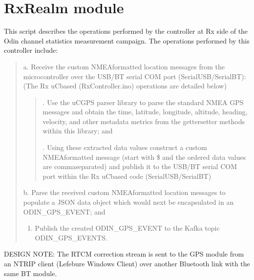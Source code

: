 \documentclass[letterpaper,10pt,english]{sphinxmanual}
\begin{document}
\section{RxRealm module}
\label{\detokenize{RxRealm:module-RxRealm}}\label{\detokenize{RxRealm:rxrealm-module}}\label{\detokenize{RxRealm::doc}}
\sphinxAtStartPar
This script describes the operations performed by the controller at Rx side of the Odin channel statistics
measurement campaign. The operations performed by this controller include:
\begin{quote}

\sphinxAtStartPar
a. Receive the custom NMEA\sphinxhyphen{}formatted location messages from the microcontroller over the USB/BT serial COM port
(SerialUSB/SerialBT): (The Rx uC\sphinxhyphen{}based (RxController.ino) operations are detailed below)
\begin{quote}

. Use the uC\sphinxhyphen{}GPS parser library to parse the standard NMEA GPS messages and obtain the time, latitude,
longitude, altitude, heading, velocity, and other metadata metrics from the getter\sphinxhyphen{}setter methods within
this library; and

. Using these extracted data values construct a custom NMEA\sphinxhyphen{}formatted message (start with \$ and the ordered
data values are comma\sphinxhyphen{}separated) and publish it to the USB/BT serial COM port within the Rx uC\sphinxhyphen{}based code
(SerialUSB/SerialBT)
\end{quote}

\sphinxAtStartPar
b. Parse the received custom NMEA\sphinxhyphen{}formatted location messages to populate a JSON data object which would next be
encapsulated in an ODIN\_GPS\_EVENT; and
\begin{enumerate}
%
\setcounter{enumi}{2}
\item {} 
\sphinxAtStartPar
Publish the created ODIN\_GPS\_EVENT to the Kafka topic ODIN\_GPS\_EVENTS.

\end{enumerate}
\end{quote}

\sphinxAtStartPar
DESIGN NOTE: The RTCM correction stream is sent to the GPS module from an NTRIP client (Lefebure Windows Client) over
another Bluetooth link with the same BT module.
\end{document}
